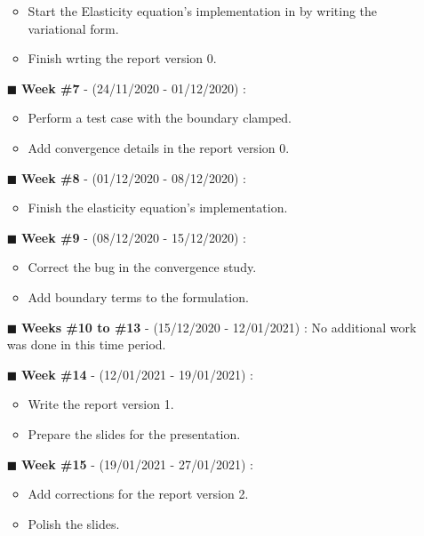 \begin{itemize}
\begin{itemize}
        \item Start the Elasticity equation's implementation in \phifem  by writing the variational form.
        \item Finish wrting the report version 0.
    \end{itemize} 
    \item[$\blacksquare$] \textbf{Week \#7} - (24/11/2020 - 01/12/2020) : \begin{itemize}
        \item Perform a test case with the boundary clamped.
        \item Add convergence details in the report version 0.
    \end{itemize} 
    \item[$\blacksquare$] \textbf{Week \#8} - (01/12/2020 - 08/12/2020) : \begin{itemize}
        \item Finish the elasticity equation's \phifem implementation.
    \end{itemize} 
    \item[$\blacksquare$] \textbf{Week \#9} - (08/12/2020 - 15/12/2020) : \begin{itemize}
        \item Correct the bug in the convergence study.   
        \item Add boundary terms to the formulation.
    \end{itemize} 
    \item[$\blacksquare$] \textbf{Weeks \#10 to \#13} - (15/12/2020 - 12/01/2021) : No additional work was done in this time period.
    \item[$\blacksquare$] \textbf{Week \#14} - (12/01/2021 - 19/01/2021) : \begin{itemize}
        \item Write the report version 1.   
        \item Prepare the slides for the presentation.
    \end{itemize}
    \item[$\blacksquare$] \textbf{Week \#15} - (19/01/2021 - 27/01/2021) : \begin{itemize}
        \item Add corrections for the report version 2. 
        \item Polish the slides.  
    \end{itemize}
\end{itemize}
